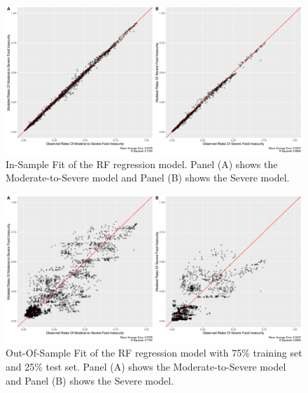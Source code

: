 \documentclass{article}
\begin{document}

\begin{figure}[H]
  \centering
  \includegraphics[width=\linewidth]{img/model/in-sample_rf.png}
  \caption{In-Sample Fit of the RF regression model. Panel (A) shows the Moderate-to-Severe model and Panel (B) shows the Severe model.}
  \label{fig:rf_in-sample}
\end{figure}

\begin{figure}[H]
  \centering
  \includegraphics[width=\linewidth]{img/model/out-sample_rf.png}
  \caption{Out-Of-Sample Fit of the RF regression model with 75\% training set and 25\% test set. Panel (A) shows the Moderate-to-Severe model and Panel (B) shows the Severe model.}
  \label{fig:rf_out-sample}
\end{figure}

\end{document}
